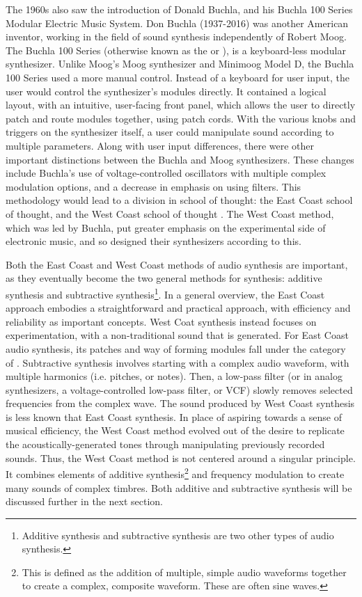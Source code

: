 The 1960s also saw the introduction of Donald  Buchla, and his Buchla 100 Series Modular Electric Music System. Don Buchla (1937-2016) was another American inventor, working in the field of sound synthesis independently of Robert Moog. The Buchla 100 Series (otherwise known as the  or ), is a keyboard-less modular synthesizer. Unlike Moog's Moog synthesizer and Minimoog Model D, the Buchla 100 Series used a more manual control\cite{Pinch_Trocco_1998}. Instead of a keyboard for user input, the user would control the synthesizer's modules directly. It contained a logical layout, with an intuitive, user-facing front panel, which allows the user to directly patch and route modules together, using patch cords. With the various knobs and triggers on the synthesizer itself, a user could manipulate sound according to multiple parameters. Along with user input differences, there were other important distinctions between the Buchla and Moog synthesizers. These changes include Buchla's use of voltage-controlled oscillators with multiple complex modulation options, and a decrease in emphasis on using filters. This methodology would lead to a division in school of thought: the East Coast school of thought, and the West Coast school of thought \cite{Gabrielli_2020}. The West Coast method, which was led by Buchla, put greater emphasis on the experimental side of electronic music, and so designed their synthesizers according to this.

Both the East Coast and West Coast methods of audio synthesis are important, as they eventually become the two general methods for synthesis: additive synthesis and subtractive synthesis\footnote{Additive synthesis and subtractive synthesis are two other types of audio synthesis.}. In a general overview, the East Coast approach embodies a straightforward and practical approach, with efficiency and reliability as important concepts. West Coat synthesis instead focuses on experimentation, with a non-traditional sound that is generated. For East Coast audio synthesis, its patches and way of forming modules fall under the category of . Subtractive synthesis involves starting with a complex audio waveform, with multiple harmonics (i.e. pitches, or notes)\cite{Winer_2018}. Then, a low-pass filter (or in analog synthesizers, a voltage-controlled low-pass filter, or VCF) slowly removes selected frequencies from the complex wave. The sound produced by West Coast synthesis is less known that East Coast synthesis. In place of aspiring towards a sense of musical efficiency, the West Coast method evolved out of the desire to replicate the acoustically-generated tones through manipulating previously recorded sounds\cite{Nielsen}. Thus, the West Coast method is not centered around a singular principle. It combines elements of additive synthesis\footnote{This is defined as the addition of multiple, simple audio waveforms together to create a complex, composite waveform. These are often sine waves.}\cite{Nielsen} and frequency modulation to create many sounds of complex timbres. Both additive and subtractive synthesis will be discussed further in the next section.
